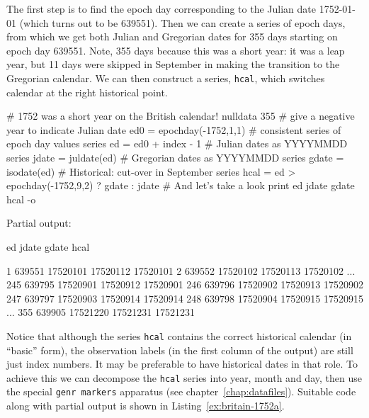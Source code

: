 The first step is to find the epoch day corresponding to the Julian
date 1752-01-01 (which turns out to be 639551). Then we can create a
series of epoch days, from which we get both Julian and Gregorian
dates for 355 days starting on epoch day 639551. Note, 355 days
because this was a short year: it was a leap year, but 11 days were
skipped in September in making the transition to the Gregorian
calendar. We can then construct a series, \texttt{hcal}, which
switches calendar at the right historical point.

\begin{script}[htbp]
  \label{ex:britain-1752}
\begin{scodebit}
# 1752 was a short year on the British calendar!
nulldata 355
# give a negative year to indicate Julian date
ed0 = epochday(-1752,1,1)
# consistent series of epoch day values
series ed = ed0 + index - 1
# Julian dates as YYYYMMDD
series jdate = juldate(ed)
# Gregorian dates as YYYYMMDD
series gdate = isodate(ed)
# Historical: cut-over in September
series hcal = ed > epochday(-1752,9,2) ? gdate : jdate
# And let's take a look
print ed jdate gdate hcal -o
\end{scodebit}
  
Partial output:
\begin{outbit}
              ed        jdate        gdate         hcal

  1       639551     17520101     17520112     17520101
  2       639552     17520102     17520113     17520102
...
245       639795     17520901     17520912     17520901
246       639796     17520902     17520913     17520902
247       639797     17520903     17520914     17520914
248       639798     17520904     17520915     17520915
...
355       639905     17521220     17521231     17521231
\end{outbit}
\end{script}

Notice that although the series \texttt{hcal} contains the correct
historical calendar (in ``basic'' form), the observation labels (in
the first column of the output) are still just index numbers. It may
be preferable to have historical dates in that role. To achieve this
we can decompose the \texttt{hcal} series into year, month and day,
then use the special \texttt{genr markers} apparatus (see
chapter~\ref{chap:datafiles}). Suitable code along with partial output
is shown in Listing~\ref{ex:britain-1752a}.

